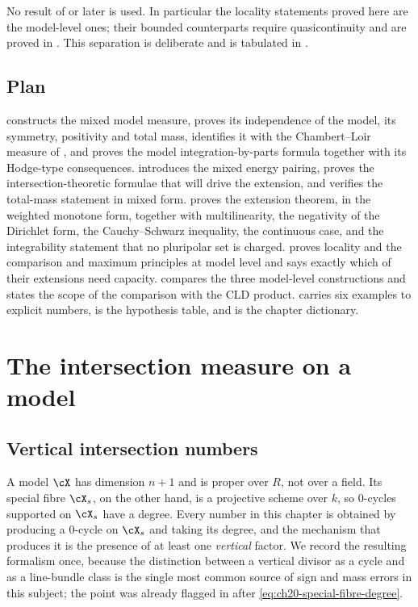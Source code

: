 No result of  or later is used.  In particular the
locality statements proved here are the model-level ones; their bounded
counterparts require quasicontinuity and are proved in
.  This separation is deliberate and is tabulated in
.

\subsection{Plan}
\label{sec:ch24-plan}

 constructs the mixed model measure, proves its
independence of the model, its symmetry, positivity and total mass,
identifies it with the Chambert--Loir measure of
, and proves the model integration-by-parts
formula together with its Hodge-type consequences.
 introduces the mixed energy pairing, proves the
intersection-theoretic formulae that will drive the extension, and verifies
the total-mass statement in mixed form.
 proves the extension theorem, in the weighted
monotone form, together with multilinearity, the negativity of the Dirichlet
form, the Cauchy--Schwarz inequality, the continuous case, and the
integrability statement that no pluripolar set is charged.
 proves locality and the comparison and maximum
principles at model level and says exactly which of their extensions need
capacity.   compares the three model-level
constructions and states the scope of the comparison with the CLD product.
 carries six examples to explicit numbers,
 is the hypothesis table, and
 is the chapter dictionary.

\section{The intersection measure on a model}
\label{sec:ch24-model-measure}

\subsection{Vertical intersection numbers}
\label{sec:ch24-vertical-numbers}

A model \(\cX\) has dimension \(n+1\) and is proper over \(R\), not over a
field.  Its special fibre \(\cX_s\), on the other hand, is a projective
scheme over \(k\), so \(0\)-cycles supported on \(\cX_s\) have a degree.
Every number in this chapter is obtained by producing a \(0\)-cycle on
\(\cX_s\) and taking its degree, and the mechanism that produces it is the
presence of at least one \emph{vertical} factor.  We record the resulting
formalism once, because the distinction between a vertical divisor as a
cycle and as a line-bundle class is the single most common source of sign
and mass errors in this subject; the point was already flagged in
 after \eqref{eq:ch20-special-fibre-degree}.

